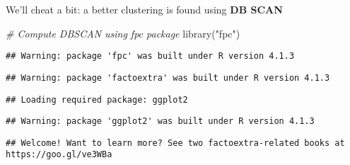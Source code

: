 \documentclass[
]{article}
\newenvironment{Shaded}{\begin{snugshade}}{\end{snugshade}}
\newcommand{\AttributeTok}[1]{\textcolor[rgb]{0.77,0.63,0.00}{#1}}
\newcommand{\CommentTok}[1]{\textcolor[rgb]{0.56,0.35,0.01}{\textit{#1}}}
\newcommand{\ConstantTok}[1]{\textcolor[rgb]{0.00,0.00,0.00}{#1}}
\newcommand{\DecValTok}[1]{\textcolor[rgb]{0.00,0.00,0.81}{#1}}
\newcommand{\FloatTok}[1]{\textcolor[rgb]{0.00,0.00,0.81}{#1}}
\newcommand{\FunctionTok}[1]{\textcolor[rgb]{0.00,0.00,0.00}{#1}}
\newcommand{\NormalTok}[1]{#1}
\newcommand{\OtherTok}[1]{\textcolor[rgb]{0.56,0.35,0.01}{#1}}
\newcommand{\SpecialCharTok}[1]{\textcolor[rgb]{0.00,0.00,0.00}{#1}}
\newcommand{\StringTok}[1]{\textcolor[rgb]{0.31,0.60,0.02}{#1}}
\begin{document}
We'll cheat a bit: a better clustering is found using \textbf{DB SCAN}

\begin{Shaded}
\begin{Highlighting}[]
\CommentTok{\# Compute DBSCAN using fpc package}
\FunctionTok{library}\NormalTok{(}\StringTok{"fpc"}\NormalTok{)}
\end{Highlighting}
\end{Shaded}

\begin{verbatim}
## Warning: package 'fpc' was built under R version 4.1.3
\end{verbatim}

\begin{Shaded}
\end{Shaded}

\begin{verbatim}
## Warning: package 'factoextra' was built under R version 4.1.3
\end{verbatim}

\begin{verbatim}
## Loading required package: ggplot2
\end{verbatim}

\begin{verbatim}
## Warning: package 'ggplot2' was built under R version 4.1.3
\end{verbatim}

\begin{verbatim}
## Welcome! Want to learn more? See two factoextra-related books at https://goo.gl/ve3WBa
\end{verbatim}

\begin{Shaded}
\end{Shaded}
\end{document}
